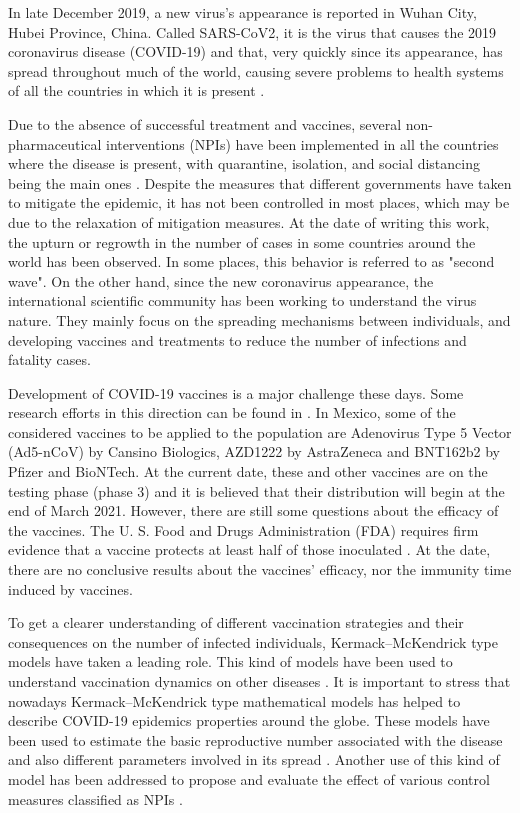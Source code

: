     In late December 2019, a new virus's appearance is reported in Wuhan City,
Hubei Province, China. Called SARS-CoV2, it is the virus that causes the 2019
coronavirus disease (COVID-19) and that, very quickly since its appearance, has
spread throughout much of the world, causing severe problems to health systems
of all the countries in which it is present \cite{Who12020}.

    Due to the absence of successful treatment and vaccines, several
non-pharmaceutical interventions (NPIs) have been implemented in all the
countries where the disease is present, with quarantine, isolation, and social
distancing being the main ones \cite{Wilder2020,Liu2020_2}. Despite
the measures that different governments have taken to mitigate the epidemic, it
has not been controlled in most places, which may be due to the relaxation of
mitigation measures. At the date of writing this work, the upturn or regrowth
in the number of cases in some countries around the world has been observed. In
some places, this behavior is referred to as "second wave". On the other hand,
since the new coronavirus appearance, the international scientific community
has been working to understand the virus nature. They mainly focus on the
spreading mechanisms between individuals, and developing vaccines and
treatments to reduce the number of infections and fatality cases.

    Development of COVID-19 vaccines is a major challenge these days. Some
research efforts in this direction can be found in \cite{Belete2020,Kaur2020}.
In Mexico, some of the considered vaccines to be applied to the population are
Adenovirus Type 5 Vector (Ad5-nCoV) by Cansino Biologics, AZD1222 by AstraZeneca
and BNT162b2 by Pfizer and BioNTech. At the current date, these and other
vaccines are on the testing phase (phase 3) and it is believed that their
distribution will begin at the end of March 2021. However, there are still some
questions about the efficacy of the vaccines. The U. S. Food and Drugs
Administration (FDA) requires firm evidence that a vaccine protects at least
half of those inoculated \cite{Shah2020}. At the date, there are no conclusive
results about the vaccines' efficacy, nor the immunity time induced by vaccines.

    To get a clearer understanding of different vaccination strategies and
their consequences on the number of infected individuals, Kermack--McKendrick
type models have taken a leading role. This kind of models have been used to
understand vaccination dynamics on other diseases \cite{Alexander2004}. It is
important to stress that nowadays Kermack--McKendrick type mathematical models
has helped to describe COVID-19 epidemics properties around the globe. These
models have been used to estimate the basic reproductive number associated with
the disease and also different parameters involved in its spread
\cite{Liu2020,Sarkar2020}. Another use of this kind of model has been addressed
to propose and evaluate the effect of various control measures classified as
NPIs \cite{Acuna2020,Ngonghala2020,Liu2020,Shaikh2020,DeVisscher2020}.

